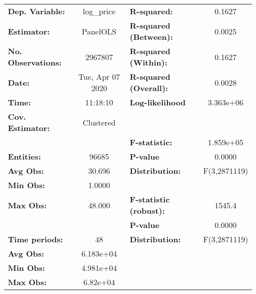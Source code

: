 \documentclass{report}
\begin{document}
\begin{center}
\begin{tabular}{lclc}
\toprule
\textbf{Dep. Variable:}      &     log\_price     & \textbf{  R-squared:         }   &      0.1627      \\
\textbf{Estimator:}          &      PanelOLS      & \textbf{  R-squared (Between):}  &      0.0025      \\
\textbf{No. Observations:}   &      2967807       & \textbf{  R-squared (Within):}   &      0.1627      \\
\textbf{Date:}               &  Tue, Apr 07 2020  & \textbf{  R-squared (Overall):}  &      0.0028      \\
\textbf{Time:}               &      11:18:10      & \textbf{  Log-likelihood     }   &    3.363e+06     \\
\textbf{Cov. Estimator:}     &     Clustered      & \textbf{                     }   &                  \\
\textbf{}                    &                    & \textbf{  F-statistic:       }   &    1.859e+05     \\
\textbf{Entities:}           &       96685        & \textbf{  P-value            }   &      0.0000      \\
\textbf{Avg Obs:}            &       30.696       & \textbf{  Distribution:      }   &   F(3,2871119)   \\
\textbf{Min Obs:}            &       1.0000       & \textbf{                     }   &                  \\
\textbf{Max Obs:}            &       48.000       & \textbf{  F-statistic (robust):} &      1545.4      \\
\textbf{}                    &                    & \textbf{  P-value            }   &      0.0000      \\
\textbf{Time periods:}       &         48         & \textbf{  Distribution:      }   &   F(3,2871119)   \\
\textbf{Avg Obs:}            &     6.183e+04      & \textbf{                     }   &                  \\
\textbf{Min Obs:}            &     4.981e+04      & \textbf{                     }   &                  \\
\textbf{Max Obs:}            &      6.82e+04      & \textbf{                     }   &                  \\
\bottomrule
\end{tabular}
\begin{tabular}{lcccccc}

\end{tabular}
\end{center}
\end{document}
